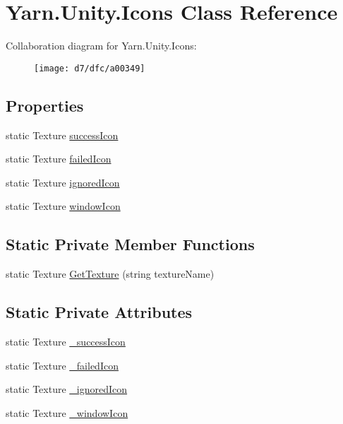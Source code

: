 \hypertarget{a00042}{\section{Yarn.\-Unity.\-Icons Class Reference}
\label{a00042}
}


Collaboration diagram for Yarn.\-Unity.\-Icons\-:
\nopagebreak
\begin{figure}[H]
\begin{center}
\leavevmode
\texttt{[image: d7/dfc/a00349]}
\end{center}
\end{figure}
\subsection*{Properties}
\begin{DoxyCompactItemize}
\item 
static Texture \hyperlink{a00042_aec8aea03eb6e31771ebc98e0611fff79}{success\-Icon}
\item 
static Texture \hyperlink{a00042_aae7cc0e5016db04a90b2aa0e80957626}{failed\-Icon}
\item 
static Texture \hyperlink{a00042_a3f03f2f0fa137e349853d755e79f2e4a}{ignored\-Icon}
\item 
static Texture \hyperlink{a00042_aa78ab016ad041bc36850c8b20ba63972}{window\-Icon}
\end{DoxyCompactItemize}
\subsection*{Static Private Member Functions}
\begin{DoxyCompactItemize}
\item 
static Texture \hyperlink{a00042_a267896b2c4512f5b17772e7e1e46d6da}{Get\-Texture} (string texture\-Name)
\end{DoxyCompactItemize}
\subsection*{Static Private Attributes}
\begin{DoxyCompactItemize}
\item 
static Texture \hyperlink{a00042_a40e137f48495168d4423c103c8935a1b}{\-\_\-success\-Icon}
\item 
static Texture \hyperlink{a00042_a75ef0bcf3f5968f11949e6bfa4fdddd5}{\-\_\-failed\-Icon}
\item 
static Texture \hyperlink{a00042_aeb6761c6115d55f24df4ad963a2d224c}{\-\_\-ignored\-Icon}
\item 
static Texture \hyperlink{a00042_abba8fef6cc12836ea431a8a7c9e2f3db}{\-\_\-window\-Icon}
\end{DoxyCompactItemize}


